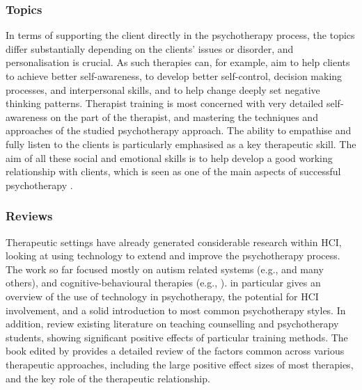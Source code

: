\documentclass[prodmode,acmtochi]{acmsmall}
\newcommand{\todo}[1]{\textrm{\textrm{\textcolor{LightBlue}{[[#1]]}}}}
\begin{document}
\subsubsection*{Topics} 
In terms of supporting the client directly in the psychotherapy process, the topics differ substantially depending on the clients' issues or disorder, and personalisation is crucial. As such therapies can, for example, aim to help clients to achieve better self-awareness, to develop better  self-control, decision making processes, and interpersonal skills, and to help change deeply set negative thinking patterns.  %
%
Therapist training is most concerned with very detailed self-awareness on the part of the therapist, and mastering the techniques and approaches of the studied psychotherapy approach. The ability to empathise and fully listen to the clients is particularly emphasised as a key therapeutic skill. The aim of all these social and emotional skills is to help develop a good working relationship with clients, which is seen as one of the main aspects of successful psychotherapy \cite{Asay1999}.

\subsubsection*{Reviews}
Therapeutic settings have already generated considerable research within
HCI,  looking at using technology to extend and improve the psychotherapy process. The work so far focused mostly on autism related systems (e.g.,
\cite{Escobedo2012,Picard2009,Hayes2011,Porayska-Pomsta2011,Hong2012} and many others), and cognitive-behavioural therapies (e.g., \cite{Coyle2011,Matthews2011}).  in particular gives an overview of the use of technology in psychotherapy, the potential for HCI involvement, and a solid introduction to most common psychotherapy styles.          
%
In addition,  review existing literature on teaching counselling and psychotherapy students, showing significant positive effects of particular training methods. The book edited by  provides a detailed review of the factors common across various therapeutic approaches, including the large positive effect sizes of most therapies, and the key role of the therapeutic relationship. 
\end{document}
